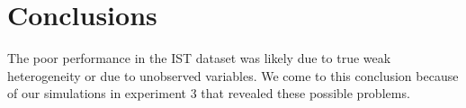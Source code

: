 

\chapter{Conclusions}



The poor performance in the IST dataset was likely due to true weak heterogeneity or due to unobserved variables. We come to this conclusion because of our simulations in experiment 3 that revealed these possible problems.


